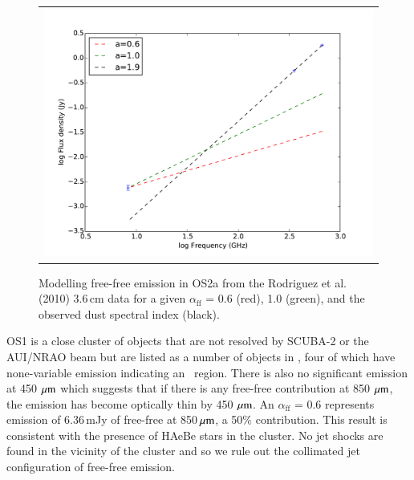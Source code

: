 \begin{figure}
\begin{centering}
\begin{tabular}{l}
\includegraphics[scale=0.5]{c4/figs/ffOS2a.pdf}
\end{tabular}
\caption{Modelling free-free emission in OS2a from the Rodriguez et al. (2010) 3.6\,cm data for a given $\alpha_{\mathrm{ff}}$ = 0.6 (red), 1.0 (green), and the observed dust spectral index (black).} 
\label{fig:freefreemodel}
\end{centering}
\end{figure} 

OS1 is a close cluster of objects that are not resolved by SCUBA-2 or the AUI/NRAO beam but are listed as a number of objects in \cite{Rodriguez:2010bs}, four of which have none-variable emission indicating an \UCHII\ region. There is also no significant emission at 450\,$\,\mu\rm{m}$ which suggests that if there is any free-free contribution at 850\,$\,\mu\rm{m}$, the emission has become optically thin by 450\,$\,\mu\rm{m}$. An $\alpha_{\mathrm{ff}}$ = 0.6 represents emission of 6.36\,mJy of free-free at 850$\,\mu\rm{m}$, a 50\% contribution. This result is consistent with the presence of HAeBe stars in the cluster. No jet shocks are found in the vicinity of the cluster and so we rule out the collimated jet configuration of free-free emission.

